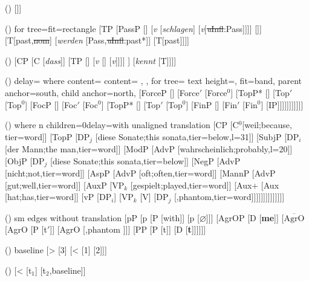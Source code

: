 \begin {forest}()
 [\vP [\textit {v}] [VP [\textit {fall}{[V, \textit {u}N]}] [Theme]]] \end {forest}
\begin {forest}()
 for tree={fit=rectangle} [TP [PassP [\vP [VP [pronoun {[\st {nom}]} ] [\phonliste {schlagen}]] [\textit {v} [\textit {schlagen}] [{\textit {v}[\st {\textit {u}Infl}:Pass]}]]] []] [{T[past,\st {nom}]} [\textit {werden} {[Pass,\st {\textit {u}Infl}:past*]}] [{T[past]}]]] \end {forest}
\begin {forest}()
 [CP [C [\emph {dass}]] [TP [\vP [\emph {diesen Mann}] [\littlevbar [ \emph {jeder}] [\littlevbar [VP [\phonliste { diesen Mann } {[D]}] [\phonliste { kennt }]] [\textit {v} [] [\textit {v}]]]] ] [\textit {kennt} {[T]}]]] \end {forest}
\begin {forest}()
 delay={ where content={}{ content={\phantom {X}} }{}, }, for tree={ text height=\mytextheight , fit=band, parent anchor=south, child anchor=north, } [ForceP [] [Force$'$ [Force$^0$] [TopP* [] [Top$'$ [Top$^0$] [FocP [] [Foc$'$ [Foc$^0$] [TopP* [] [Top$'$ [Top$^0$] [FinP [] [Fin$'$ [Fin$^0$] [IP]]]]]]]]]]] \end {forest}
\begin {forest}()
 where n children=0{delay=with unaligned translation}{} [CP [C$^0$[weil;because, tier=word]] [TopP [DP$_j$ [diese Sonate;this sonata,tier=below,l=31\baselineskip ]] [SubjP [DP$_i$ [der Mann;the man,tier=word]] [ModP [AdvP [wahrscheinlich;probably,l=20\baselineskip ]] [ObjP [DP$_j$ [diese Sonate;this sonata,tier=below]] [NegP [AdvP [nicht;not,tier=word]] [AspP [AdvP [oft;often,tier=word]] [MannP [AdvP [gut;well,tier=word]] [AuxP [VP$_k$ [gespielt;played,tier=word]] [Aux+ [Aux [hat;has,tier=word]] [vP [DP$_i$] [VP$_k$ [V] [DP$_j$ [,phantom,tier=word]]]]]]]]]]]]]] \end {forest}
\begin {forest}()
 sm edges without translation [pP [p [P [with]] [p [$\varnothing $]]] [AgrOP [D [\textbf {me}]] [$\overline {\mbox {AgrO}}$ [AgrO [P [t$'$]] [AgrO [,phantom ]]] [PP [P [t]] [D [\textbf {t}]]]]]] \end {forest}
\begin {forest}()
 baseline [> [3] [< [1] [2]]] \end {forest}
\begin {forest}()
 [< [t\ensuremath {_1}] [t\ensuremath {_2},baseline]] \end {forest}
